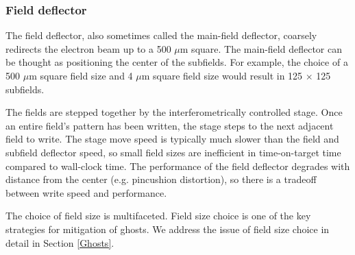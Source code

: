 \documentclass[]{spie}  %
\begin{document}
\subsubsection{Field deflector}
\label{sec:Field}
The field deflector, also sometimes called the main-field deflector, coarsely redirects the electron beam up to a 500 $\mu$m square.  The main-field deflector can be thought as positioning the center of the subfields.  For example, the choice of a 500 $\mu$m square field size and 4 $\mu$m square field size would result in 125 $\times$ 125 subfields.

The fields are stepped together by the interferometrically controlled stage.  Once an entire field's pattern has been written, the stage steps to the next adjacent field to write.  The stage move speed is typically much slower than the field and subfield deflector speed, so small field sizes are inefficient in time-on-target time compared to wall-clock time.  The performance of the field deflector degrades with distance from the center (e.g. pincushion distortion), so there is a tradeoff between write speed and performance.  

The choice of field size is multifaceted.  Field size choice is one of the key strategies for mitigation of ghosts.  We address the issue of field size choice in detail in Section \ref{Ghosts}.  
\end{document}
